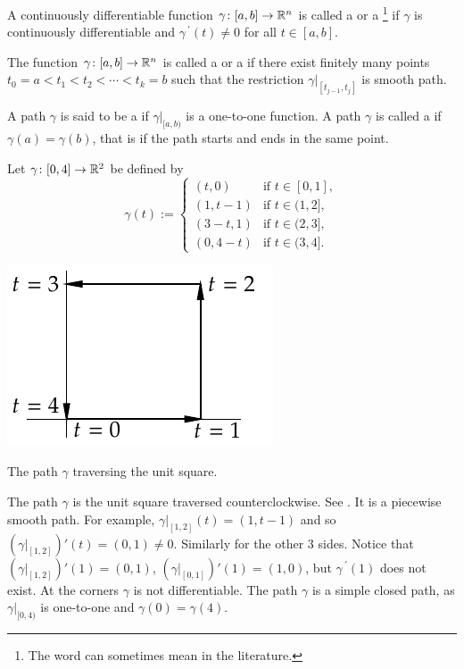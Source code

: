 \begin{defn}
A continuously differentiable function $\gamma \colon [a,b] \to {\mathbb{R}}^n$ is
called a \emph{}
or a
\emph{}\footnote{The
word  can sometimes mean
 in the literature.}
if
$\gamma$ is continuously differentiable and
$\gamma^{\:\prime}(t) \not= 0$ for all $t \in [a,b]$.

The function $\gamma \colon [a,b] \to {\mathbb{R}}^n$ is called a
\emph{} or a
\emph{}
if there exist finitely many points
$t_0 = a < t_1 < t_2 < \cdots < t_k = b$ such that
the restriction $\gamma|_{[t_{j-1},t_j]}$ is smooth path.

A path $\gamma$ is said to be a \emph{} if $\gamma|_{[a,b)}$ is
a one-to-one function.  A path $\gamma$ is 
called
a \emph{} if $\gamma(a) = \gamma(b)$, that is
if the path starts and ends in the same point.
\end{defn}


\begin{example} \label{mv:example:unitsquarepath}
Let $\gamma \colon [0,4] \to {\mathbb{R}}^2$ be defined by
\begin{equation*}
\gamma(t) :=
\begin{cases}
(t,0)   & \text{if } t \in [0,1],\\
(1,t-1) & \text{if } t \in (1,2],\\
(3-t,1) & \text{if } t \in (2,3],\\
(0,4-t) & \text{if } t \in (3,4].
\end{cases}
\end{equation*}
\begin{myfigureht}
\includegraphics{figures/squarepath}
\caption{The path $\gamma$ traversing the unit square.\label{fig:squarepath}}
\end{myfigureht}

The path $\gamma$ is the unit square traversed
counterclockwise.  See .  It is
a piecewise smooth path.  For example,
$\gamma|_{[1,2]}(t) = (1,t-1)$ and so
$(\gamma|_{[1,2]})'(t) = (0,1) \not= 0$.  Similarly for the other 3 sides.
Notice
that
$(\gamma|_{[1,2]})'(1) = (0,1)$,
$(\gamma|_{[0,1]})'(1) = (1,0)$, but
$\gamma^{\:\prime}(1)$ does not exist.  At the corners $\gamma$ is 
not differentiable.
The path $\gamma$ is a simple closed path, as $\gamma|_{[0,4)}$ is
one-to-one and $\gamma(0)=\gamma(4)$.
\end{example}

